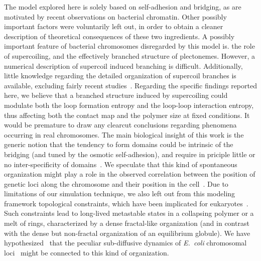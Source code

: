 \documentclass[
preprint,
a4paper,
12pt,
superscriptaddress,
pre]{revtex4}
\begin{document}
The model explored here is solely based on self-adhesion and bridging,
as are motivated by recent observations on bacterial chromatin.  Other
possibly important factors were voluntarily left out, in order to
obtain a cleaner description of theoretical consequences of these two
ingredients. 
%
A possibly important feature of bacterial chromosomes disregarded by
this model is. the role of supercoiling, and the effectively branched
structure of plectonemes.  However, a numerical description of
supercoil induced branching is difficult. Additionally, little
knowledge regarding the detailed organization of supercoil branches is
available, excluding fairly recent studies~\cite{Le2013}.
%
Regarding the specific findings reported here, we believe that a
branched structure induced by supercoiling could modulate both the
loop formation entropy and the loop-loop interaction entropy, thus
affecting both the contact map and the polymer size at fixed
conditions. 
%
It would be premature to draw any clearcut conclusions regarding
phenomena occurring in real chromosomes.  The  main biological insight
of this work is  the generic notion that the tendency to form domains
could be intrinsic of the bridging (and tuned by the osmotic
self-adhesion), and require in priciple little or no inter-specificity
of domains~\cite{Barbieri2012}. We speculate that this kind of
spontaneous organization might play a role in the observed correlation
between the position of genetic loci along the chromosome and their
position in the cell~\cite{Wiggins2010}.
Due to limitations of our simulation technique, we also left out from this
modeling framework topological constraints, which have been implicated
for eukaryotes~\cite{Mirny2011,Halverson2014}. Such constraints lead
to long-lived metastable states in a collapsing polymer or a melt of
rings, characterized by a dense fractal-like organization (and in
contrast with the dense but non-fractal organization of an equilibrium
globule). We have hypothesized~\cite{Benza2012} that the peculiar
sub-diffusive dynamics of \emph{E.~coli} chromosomal
loci~\cite{Weber2010,Javer2013} might be connected to this kind of
organization.
\end{document}
